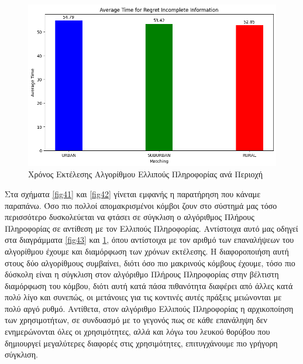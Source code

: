 \begin{figure}[H]
    \centering
    \includegraphics[width=\textwidth]{figures/chapter4/Average_Time_per_area_RII.png}
    \caption{Χρόνος Εκτέλεσης Αλγορίθμου Ελλιπούς Πληροφορίας ανά Περιοχή}
    \label{fig44}
\end{figure}

Στα σχήματα \ref{fig41} και \ref{fig42} γίνεται εμφανής η παρατήρηση που κάναμε παραπάνω. Όσο πιο πολλοί απομακρισμένοι κόμβοι ζουν στο σύστημά μας τόσο περισσότερο δυσκολεύεται να φτάσει σε σύγκλιση ο αλγόριθμος Πλήρους Πληροφορίας σε αντίθεση με τον Ελλιπούς Πληροφορίας. Αντίστοιχα αυτό μας οδηγεί στα διαγράμματα \ref{fig43} και \ref{fig44}, όπου αντίστοιχα με τον αριθμό των επαναλήψεων του αλγορίθμου έχουμε και διαμόρφωση των χρόνων εκτέλεσης. Η διαφοροποιήση αυτή στους δύο αλγορίθμους συμβαίνει, διότι όσο πιο μακρινούς κόμβους έχουμε, τόσο πιο δύσκολη είναι η σύγκλιση στον αλγόριθμο Πλήρους Πληροφορίας στην βέλτιστη διαμόρφωση του κόμβου, διότι αυτή κατά πάσα πιθανότητα διαφέρει από άλλες κατά πολύ λίγο και συνεπώς, οι μετάνοιες για τις κοντινές αυτές πράξεις μειώνονται με πολύ αργό ρυθμό. Αντίθετα, στον αλγόριθμο Ελλιπούς Πληροφορίας η αρχικοποίηση των χρησιμοτήτων, σε συνδυασμό με το γεγονός πως σε κάθε επανάληψη δεν ενημερώνονται όλες οι χρησιμότητες, αλλά και λόγω του λευκού θορύβου που δημιουργεί μεγαλύτερες διαφορές στις χρησιμότητες, επιτυγχάνουμε πιο γρήγορη σύγκλιση.

\newpage

